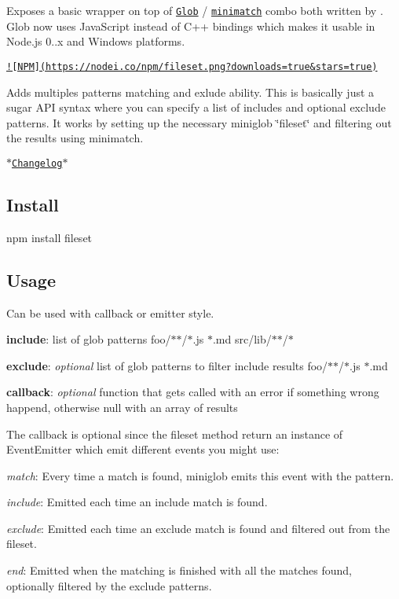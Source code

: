 Exposes a basic wrapper on top of \href{https://github.com/isaacs/node-glob}{\tt Glob} / \href{https://github.com/isaacs/minimatch}{\tt minimatch} combo both written by . Glob now uses Java\+Script instead of C++ bindings which makes it usable in Node.\+js 0..\+x and Windows platforms.

\href{https://nodei.co/npm/fileset/}{\tt !\mbox{[}N\+P\+M\mbox{]}(https\+://nodei.\+co/npm/fileset.\+png?downloads=true\&stars=true)}

Adds multiples patterns matching and exlude ability. This is basically just a sugar A\+P\+I syntax where you can specify a list of includes and optional exclude patterns. It works by setting up the necessary miniglob \char`\"{}fileset\char`\"{} and filtering out the results using minimatch.

$\ast$\href{https://github.com/mklabs/node-fileset/blob/master/CHANGELOG.md#changelog}{\tt Changelog}$\ast$

\subsection*{Install}

\begin{DoxyVerb}npm install fileset
\end{DoxyVerb}


\subsection*{Usage}

Can be used with callback or emitter style.


\begin{DoxyItemize}
\item {\bfseries include}\+: list of glob patterns {\ttfamily foo/$\ast$$\ast$/$\ast$.js $\ast$.md src/lib/$\ast$$\ast$/$\ast$}
\item {\bfseries exclude}\+: {\itshape optional} list of glob patterns to filter include results {\ttfamily foo/$\ast$$\ast$/$\ast$.js $\ast$.md}
\item {\bfseries callback}\+: {\itshape optional} function that gets called with an error if something wrong happend, otherwise null with an array of results
\end{DoxyItemize}

The callback is optional since the fileset method return an instance of Event\+Emitter which emit different events you might use\+:


\begin{DoxyItemize}
\item {\itshape match}\+: Every time a match is found, miniglob emits this event with the pattern.
\item {\itshape include}\+: Emitted each time an include match is found.
\item {\itshape exclude}\+: Emitted each time an exclude match is found and filtered out from the fileset.
\item {\itshape end}\+: Emitted when the matching is finished with all the matches found, optionally filtered by the exclude patterns.
\end{DoxyItemize}

